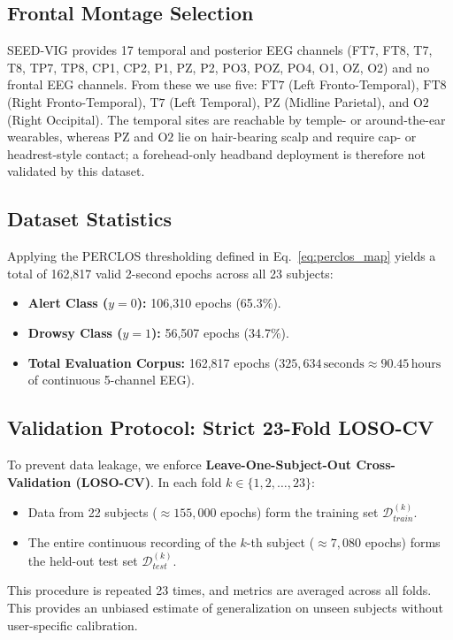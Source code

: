 \documentclass[conference]{IEEEtran}
\begin{document}
\subsection{Frontal Montage Selection}
SEED-VIG provides 17 temporal and posterior EEG channels (FT7, FT8, T7, T8, TP7, TP8, CP1, CP2, P1, PZ, P2, PO3, POZ, PO4, O1, OZ, O2) and no frontal EEG channels. From these we use five: $\text{FT7}$ (Left Fronto-Temporal), $\text{FT8}$ (Right Fronto-Temporal), $\text{T7}$ (Left Temporal), $\text{PZ}$ (Midline Parietal), and $\text{O2}$ (Right Occipital). The temporal sites are reachable by temple- or around-the-ear wearables, whereas $\text{PZ}$ and $\text{O2}$ lie on hair-bearing scalp and require cap- or headrest-style contact; a forehead-only headband deployment is therefore not validated by this dataset.

\subsection{Dataset Statistics}
Applying the PERCLOS thresholding defined in Eq.~\eqref{eq:perclos_map} yields a total of 162,817 valid 2-second epochs across all 23 subjects:
\begin{itemize}[leftmargin=*]
    \item \textbf{Alert Class ($y=0$):} 106,310 epochs (65.3\%).
    \item \textbf{Drowsy Class ($y=1$):} 56,507 epochs (34.7\%).
    \item \textbf{Total Evaluation Corpus:} 162,817 epochs ($325,634\,\text{seconds} \approx 90.45\,\text{hours}$ of continuous 5-channel EEG).
\end{itemize}

\subsection{Validation Protocol: Strict 23-Fold LOSO-CV}
To prevent data leakage, we enforce \textbf{Leave-One-Subject-Out Cross-Validation (LOSO-CV)}. In each fold $k \in \{1, 2, \dots, 23\}$:
\begin{itemize}[leftmargin=*]
    \item Data from 22 subjects ($\approx 155,000$ epochs) form the training set $\mathcal{D}_{train}^{(k)}$.
    \item The entire continuous recording of the $k$-th subject ($\approx 7,080$ epochs) forms the held-out test set $\mathcal{D}_{test}^{(k)}$.
\end{itemize}
This procedure is repeated 23 times, and metrics are averaged across all folds. This provides an unbiased estimate of generalization on unseen subjects without user-specific calibration.
\end{document}
